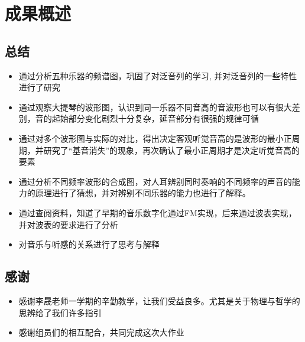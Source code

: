 \chapter{成果概述}
\section{总结}

\begin{itemize}
    \item 通过分析五种乐器的频谱图，巩固了对泛音列的学习, 并对泛音列的一些特性进行了研究
    \item 通过观察大提琴的波形图，认识到同一乐器不同音高的音波形也可以有很大差别，音的起始部分变化剧烈十分复杂，延音部分有很强的规律可循
    \item 通过对多个波形图与实际的对比，得出决定客观听觉音高的是波形的最小正周期，并研究了“基音消失”的现象，再次确认了最小正周期才是决定听觉音高的要素
    \item 通过分析不同频率波形的合成图，对人耳辨别同时奏响的不同频率的声音的能力的原理进行了猜想，并对辨别不同乐器的能力也进行了解释。
    \item 通过查阅资料，知道了早期的音乐数字化通过FM实现，后来通过波表实现，并对波表的要求进行了分析
    \item 对音乐与听感的关系进行了思考与解释
\end{itemize}

\section{感谢}
\begin{itemize}
    \item 感谢李晟老师一学期的辛勤教学，让我们受益良多。尤其是关于物理与哲学的思辨给了我们许多指引
    \item 感谢组员们的相互配合，共同完成这次大作业
\end{itemize}
